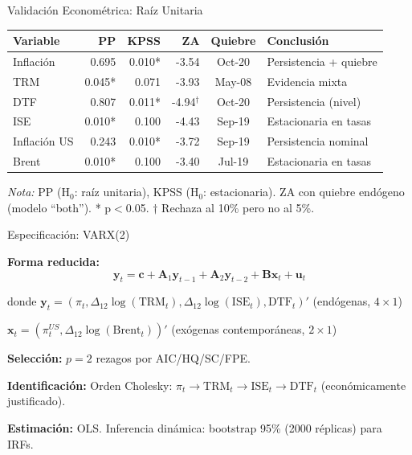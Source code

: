 \documentclass[aspectratio=169, 11pt]{beamer}
\begin{document}
\begin{frame}[fragile]{Validación Econométrica: Raíz Unitaria}
\scriptsize
\begin{center}
\begin{tabular}{lrrrcp{3.0cm}}
\toprule
\textbf{Variable} & \textbf{PP} & \textbf{KPSS} & \textbf{ZA} & \textbf{Quiebre} & \textbf{Conclusión} \\
\midrule
Inflación & 0.695 & 0.010* & -3.54 & Oct-20 & Persistencia + quiebre \\
TRM & 0.045* & 0.071 & -3.93 & May-08 & Evidencia mixta \\
DTF & 0.807 & 0.011* & -4.94$^\dagger$ & Oct-20 & Persistencia (nivel) \\
ISE & 0.010* & 0.100 & -4.43 & Sep-19 & Estacionaria en tasas \\
Inflación US & 0.243 & 0.010* & -3.72 & Sep-19 & Persistencia nominal \\
Brent & 0.010* & 0.100 & -3.40 & Jul-19 & Estacionaria en tasas \\
\bottomrule
\end{tabular}
\end{center}

\vspace{0.2cm}
\tiny
\textit{Nota:} PP (H$_0$: raíz unitaria), KPSS (H$_0$: estacionaria). ZA con quiebre endógeno (modelo ``both''). * p$<$0.05. $\dagger$ Rechaza al 10\% pero no al 5\%.
\end{frame}

\begin{frame}{Especificación: VARX(2)}
\normalsize
\vspace{0.3cm}

\textbf{Forma reducida:}
\[
\mathbf{y}_t = \mathbf{c} + \mathbf{A}_1 \mathbf{y}_{t-1} + \mathbf{A}_2 \mathbf{y}_{t-2} + \mathbf{B} \mathbf{x}_t + \mathbf{u}_t
\]

\small
donde $\mathbf{y}_t = (\pi_t, \Delta_{12}\log(\text{TRM}_t), \Delta_{12}\log(\text{ISE}_t), \text{DTF}_t)'$ (endógenas, $4 \times 1$)

$\mathbf{x}_t = (\pi^{US}_t, \Delta_{12}\log(\text{Brent}_t))'$ (exógenas contemporáneas, $2 \times 1$)

\vspace{0.3cm}
\normalsize
\textbf{Selección:} $p = 2$ rezagos por AIC/HQ/SC/FPE.

\textbf{Identificación:} Orden Cholesky: $\pi_t \to \text{TRM}_t \to \text{ISE}_t \to \text{DTF}_t$ (económicamente justificado).

\textbf{Estimación:} OLS. Inferencia dinámica: bootstrap 95\% (2000 réplicas) para IRFs.
\end{frame}
\end{document}

